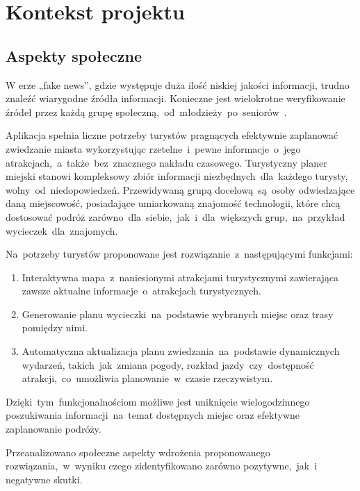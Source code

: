 
\chapter{Kontekst projektu}
\label{ch:kontekst-projektu}

\section{Aspekty społeczne}
\label{sec:aspekty-spoleczne}

W erze „fake news”, gdzie występuje duża ilość niskiej jakości informacji, trudno znaleźć wiarygodne źródła informacji.
Konieczne jest wielokrotne weryfikowanie źródeł przez każdą grupę społeczną,~od~młodzieży~po~seniorów~\cite{fakenews}.

\indent Aplikacja spełnia liczne potrzeby turystów pragnących efektywnie zaplanować zwiedzanie miasta wykorzystując rzetelne~i~pewne informacje~o~jego atrakcjach,~a~także~bez~znacznego nakładu czasowego.
Turystyczny planer miejski stanowi kompleksowy zbiór informacji niezbędnych~dla~każdego turysty, wolny~od~niedopowiedzeń.
Przewidywaną grupą docelową~są~osoby odwiedzające daną miejscowość, posiadające umiarkowaną znajomość technologii, które chcą dostosować podróż zarówno~dla~siebie,~jak~i~dla~większych grup,~na~przykład wycieczek~dla~znajomych.

\indent Na~potrzeby turystów proponowane jest rozwiązanie~z~następującymi funkcjami:

\begin{enumerate}
    \item Interaktywna mapa~z~naniesionymi atrakcjami turystycznymi zawierająca zawsze aktualne informacje~o~atrakcjach turystycznych.
    \item Generowanie planu wycieczki~na~podstawie wybranych miejsc oraz trasy pomiędzy nimi.
    \item Automatyczna aktualizacja planu zwiedzania~na~podstawie dynamicznych wydarzeń, takich~jak~zmiana pogody, rozkład jazdy~czy~dostępność atrakcji,~co~umożliwia planowanie~w~czasie rzeczywistym.
\end{enumerate}

Dzięki~tym~funkcjonalnościom możliwe jest uniknięcie wielogodzinnego poszukiwania informacji~na~temat dostępnych miejsc oraz efektywne zaplanowanie podróży.

\indent Przeanalizowano społeczne aspekty wdrożenia proponowanego rozwiązania,~w~wyniku czego zidentyfikowano zarówno pozytywne,~jak~i negatywne skutki.

